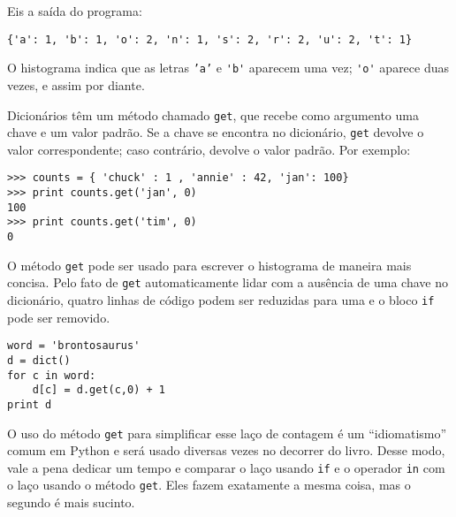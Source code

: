 Eis a saída do programa:

\beforeverb
\begin{verbatim}
{'a': 1, 'b': 1, 'o': 2, 'n': 1, 's': 2, 'r': 2, 'u': 2, 't': 1}
\end{verbatim}
\afterverb
%

O histograma indica que as letras {\tt 'a'} e \verb"'b'" aparecem uma vez; \verb"'o'" aparece duas vezes, e assim por diante.


Dicionários têm um método chamado {\tt get}, que recebe como argumento uma chave e um valor padrão. Se a chave se encontra no dicionário, {\tt get} devolve o valor correspondente; caso contrário, devolve o valor padrão. Por exemplo:

\beforeverb
\begin{verbatim}
>>> counts = { 'chuck' : 1 , 'annie' : 42, 'jan': 100}
>>> print counts.get('jan', 0)
100
>>> print counts.get('tim', 0)
0
\end{verbatim}
\afterverb
%

O método {\tt get} pode ser usado para escrever o histograma de maneira mais concisa.
Pelo fato de {\tt get} automaticamente lidar com a ausência de uma chave no dicionário, quatro linhas de código podem ser reduzidas para uma e o bloco {\tt if} pode ser removido.

\beforeverb
\begin{verbatim}
word = 'brontosaurus'
d = dict()
for c in word:
    d[c] = d.get(c,0) + 1
print d
\end{verbatim}
\afterverb
%

O uso do método {\tt get} para simplificar esse laço de contagem é um ``idiomatismo'' comum em Python e será usado diversas vezes no decorrer do livro. Desse modo, vale a pena dedicar um tempo e comparar o laço usando {\tt if} e o operador {\tt in} com o laço usando o método {\tt get}. Eles fazem exatamente a mesma coisa, mas o segundo é mais sucinto.


